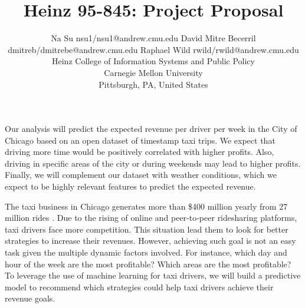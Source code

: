 \documentclass[twoside,11pt]{article}
\begin{document}
\title{Heinz 95-845: Project Proposal}

\author{\name Na Su \email nsu1/nsu1@andrew.cmu.edu
       \AND
       \name David Mitre Becerril \email dmitreb/dmitrebe@andrew.cmu.edu
       \AND
       \name Raphael Wild \email rwild/rwild@andrew.cmu.edu \\
       \addr Heinz College of Information Systems and Public Policy\\
       Carnegie Mellon University\\
       Pittsburgh, PA, United States\\}
\maketitle
Our analysis will predict the expected revenue per driver per week in the City of Chicago based on an open dataset of timestamp taxi trips. We expect that driving more time would be positively correlated with higher profits. Also, driving in specific areas of the city or during weekends may lead to higher profits. Finally, we will complement our dataset with weather conditions, which we expect to be highly relevant features to predict the expected revenue.\par

The taxi business in Chicago generates more than \$400 million yearly from 27 million rides \cite{ChicagoDigital}. Due to the rising of online and peer-to-peer ridesharing platforms, taxi drivers face more competition. This situation lead them to look for better strategies to increase their revenues. However, achieving such goal is not an easy task given the multiple dynamic factors involved. For instance, which day and hour of the week are the most profitable? Which areas are the most profitable? To leverage the use of machine learning for taxi drivers, we will build a predictive model to recommend which strategies could help taxi drivers achieve their revenue goals.\par
\end{document}
